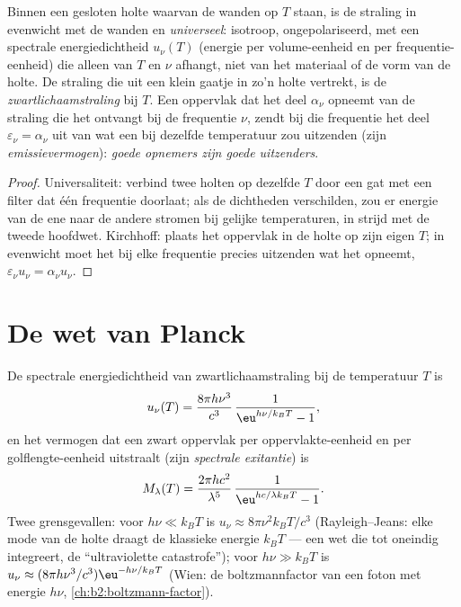 \begin{proposition}\label{prop:b2:thermal-radiation:kirchhoff}
Binnen een gesloten holte waarvan de wanden op $T$ staan, is de straling in
evenwicht met de wanden en \emph{universeel}: isotroop,
ongepolariseerd, met een spectrale energiedichtheid $u_\nu(T)$ (energie per
volume-eenheid en per frequentie-eenheid) die alleen van $T$ en $\nu$
afhangt, niet van
het materiaal of de vorm van de holte. De straling die uit een klein gaatje in
zo'n holte vertrekt, is de \emph{zwartlichaamstraling} bij $T$. Een
oppervlak dat het deel $\alpha_\nu$ opneemt van de straling die het ontvangt
bij de frequentie $\nu$, zendt bij die frequentie het deel
$\varepsilon_\nu = \alpha_\nu$ uit van wat een  bij dezelfde
temperatuur zou uitzenden (zijn \emph{emissievermogen}):
\emph{goede opnemers zijn goede uitzenders}.
\end{proposition}

\begin{proof}
Universaliteit: verbind twee holten op dezelfde $T$ door een gat met een
filter dat één frequentie doorlaat; als de dichtheden verschilden, zou er energie
van de ene naar de andere stromen bij gelijke temperaturen, in strijd met de tweede
hoofdwet. Kirchhoff: plaats het oppervlak in de holte op zijn eigen $T$; in
evenwicht moet het bij elke frequentie precies uitzenden wat het opneemt,
$\varepsilon_\nu u_\nu = \alpha_\nu u_\nu$.
\end{proof}

\section{De wet van Planck}

\begin{theorem}\label{thm:b2:thermal-radiation:planck}
De spectrale energiedichtheid van zwartlichaamstraling bij de temperatuur
$T$ is
\[
u_\nu(T) = \frac{8\pi h\nu^3}{c^3}\,\frac{1}{\eu^{h\nu/k_BT} - 1},
\]
en het vermogen dat een zwart oppervlak per oppervlakte-eenheid en per
golflengte-eenheid uitstraalt (zijn \emph{spectrale
exitantie}) is
\[
M_\lambda(T) = \frac{2\pi hc^2}{\lambda^5}\,\frac{1}{\eu^{hc/\lambda k_BT} - 1}.
\]
Twee grensgevallen: voor $h\nu \ll k_BT$ is $u_\nu \approx 8\pi\nu^2 k_BT/c^3$
(Rayleigh--Jeans: elke mode van de holte draagt de klassieke energie
$k_BT$ --- een wet die tot oneindig integreert, de ``ultraviolette
catastrofe''); voor $h\nu \gg k_BT$ is
$u_\nu \approx (8\pi h\nu^3/c^3)
\eu^{-h\nu/k_BT}$ (Wien: de boltzmannfactor
van een foton met energie
$h\nu$, \cref{ch:b2:boltzmann-factor}).
\end{theorem}


